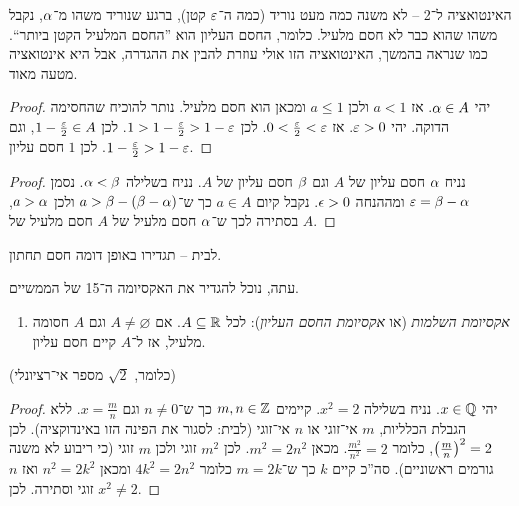 \documentclass[name=רשימות חשבון דיפרנציאלי ואינטגרלי 1א]{../../../tex/classes/megasumPreamble}
\begin{document}
	האינטואציה ל־2 – לא משנה כמה מעט נוריד (כמה ה־$\eg$ קטן), ברגע שנוריד משהו מ־$\alpha$, נקבל משהו שהוא כבר לא חסם מלעיל. כלומר, החסם העליון הוא ''החסם המלעיל הקטן ביותר``. כמו שנראה בהמשך, האינטואציה הזו אולי עוזרת להבין את ההגדרה, אבל היא אינטואציה מטעה מאוד.

	\begin{proof}
		יהי $\alpha \in A$. אז $a < 1$ ולכן $a \le 1$ ומכאן הוא חסם מלעיל. נותר להוכיח שהחסימה הדוקה. יהי $\eg > 0$. אז $0 < \frac{\vepsi}{2} < \eg$. לכן $1 > 1 - \frac{\eg}{2} > 1 - \eg$. לכן $1 - \frac{\eg}{2} \in A$, וגם $1 - \frac{\eg}{2} > 1 - \eg$. לכן $1$ חסם עליון.
	\end{proof}
	\begin{proof}
		נניח $\alpha$ חסם עליון של $A$ וגם $\beta$ חסם עליון של $A$. נניח בשלילה $\alpha < \beta$. נסמן $\eg = \bg - \ag$ ומההנחה $\epsilon > 0$. נקבל קיום $a \in A$ כך ש־$a > \beta - (\beta - \alpha)$ ולכן $a > \alpha$, בסתירה לכך ש־$\alpha$ חסם מלעיל של $A$ חסם מלעיל של $A$.
	\end{proof}


	לבית – תגדירו באופן דומה חסם תחתון.

	עתה, נוכל להגדיר את האקסיומה ה־15 של הממשיים.
	\begin{enumerate}
		\item \textit{אקסיומת השלמות} (או \textit{אקסיומת החסם העליון}): לכל $A \subseteq \mathbb{R}$. אם $A \neq \varnothing$ וגם $A$ חסומה מלעיל, אז ל־$A$ קיים חסם עליון.
	\end{enumerate}
	(כלומר, $\sqrt2$ מספר אי־רציונלי) \begin{proof}
		יהי $x \in \mathbb{Q}$. נניח בשלילה $x^2 = 2$. קיימים $m, n \in \mathbb{Z}$ כך ש־$n \neq 0$ וגם $x = \frac{m}{n}$. ללא הגבלת הכלליות, $m$ אי־זוגי או $n$ אי־זוגי (לבית: לסגור את הפינה הזו באינדוקציה). לכן $\left ( \frac{m}{n} \right )^2 = 2$, כלומר $\frac{m^2}{n^2} = 2$. מכאן $m^2 = 2n^2$. לכן $m^2$ זוגי ולכן $m$ זוגי (כי ריבוע לא משנה גורמים ראשוניים). סה''כ קיים $k$ כך ש־$m = 2k$ כלומר $4k^2 = 2n^2$ ומכאן $n^2 = 2k^2$ ואז $n$ זוגי וסתירה. לכן $x^2 \neq 2$.
	\end{proof}
\end{document}
